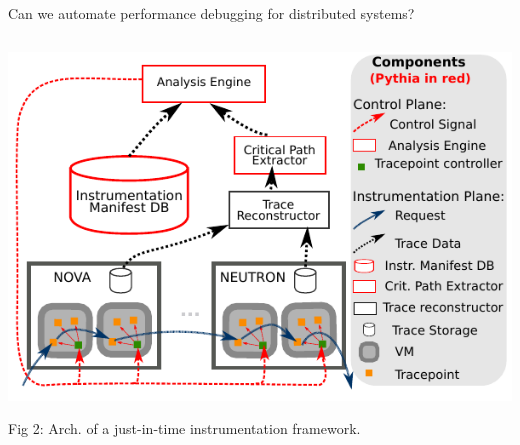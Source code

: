\begin{frame}{Can we automate performance debugging for distributed systems?}
\begin{columns}[T]
\begin{column}{.4\textwidth}
      \includegraphics[width=.9\textwidth]{figures/architecture.pdf}

      {\tiny Fig 2: Arch. of a just-in-time instrumentation framework.}

    \end{column}
  \end{columns}
\end{frame}



